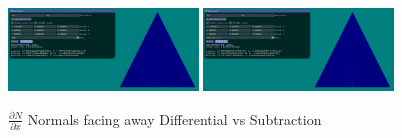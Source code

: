 \documentclass[12pt]{article}
\newcommand{\oneimgwidth}{0.45}
\newcommand{\dnndx}{\frac{\partial N}{\partial x}}
\begin{document}
\begin{figure}[htbp] 
	\centering
	\includegraphics[width=\oneimgwidth\textwidth]{dnn/ddndx_na_nc_facing_away.png}
	\includegraphics[width=\oneimgwidth\textwidth]{dnn/dnndx_sub_na_nac_facing_away.png}
	\caption{$\dnndx$ Normals facing away Differential vs Subtraction}
	\label{fig:dndx}
\end{figure}
\end{document}

